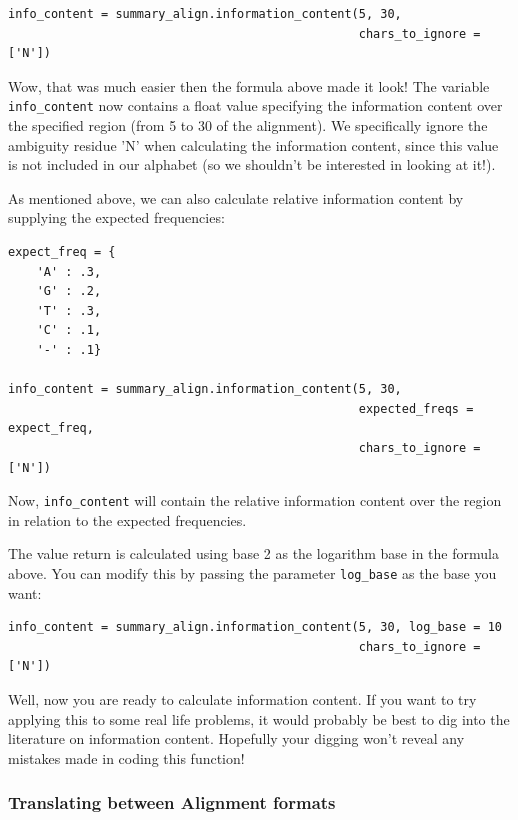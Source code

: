 \documentclass{article}
\begin{document}
\begin{verbatim}
info_content = summary_align.information_content(5, 30, 
                                                 chars_to_ignore = ['N'])
\end{verbatim}

Wow, that was much easier then the formula above made it look! The variable \verb|info_content| now contains a float value specifying the information content over the specified region (from 5 to 30 of the alignment). We specifically ignore the ambiguity residue 'N' when calculating the information content, since this value is not included in our alphabet (so we shouldn't be interested in looking at it!).


As mentioned above, we can also calculate relative information content by supplying the expected frequencies:

\begin{verbatim}
expect_freq = {
    'A' : .3,
    'G' : .2,
    'T' : .3,
    'C' : .1,
    '-' : .1}

info_content = summary_align.information_content(5, 30,
                                                 expected_freqs = expect_freq,
                                                 chars_to_ignore = ['N'])
\end{verbatim}

Now, \verb|info_content| will contain the relative information content over the region in relation to the expected frequencies.


The value return is calculated using base 2 as the logarithm base in the formula above. You can modify this by passing the parameter \verb|log_base| as the base you want:

\begin{verbatim}
info_content = summary_align.information_content(5, 30, log_base = 10
                                                 chars_to_ignore = ['N'])
\end{verbatim}

Well, now you are ready to calculate information content. If you want to try applying this to some real life problems, it would probably be best to dig into the literature on information content. Hopefully your digging won't reveal any mistakes made in coding this function!

\subsubsection{Translating between Alignment formats}
\label{sec:align_translate}
\end{document}
